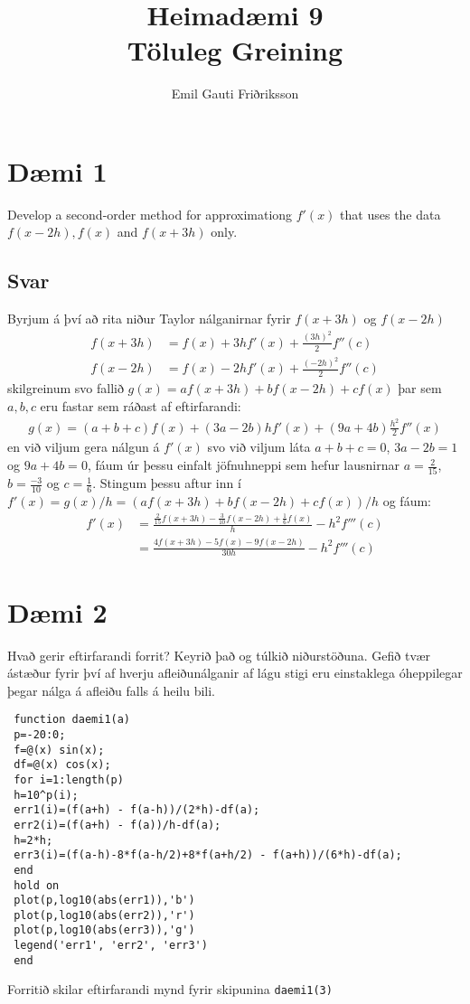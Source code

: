 \documentclass[11pt]{article}
\title{\vspace{-2ex}Heimadæmi 9\\ \vspace{0.2cm} \large Töluleg Greining\vspace{-2ex}}
\author{Emil Gauti Friðriksson}
\begin{document}
\maketitle
\section*{Dæmi 1}
Develop a second-order method for approximationg $f'(x)$ that uses the data $f(x-2h),f(x)$ and $f(x+3h)$ only.
\subsection*{Svar}
Byrjum á því að rita niður Taylor nálganirnar fyrir $f(x+3h)$ og $f(x-2h)$
\begin{align*}
f(x+3h) &= f(x) + 3hf'(x) + \frac{(3h)^2}{2}f''(c)\\
f(x-2h) &= f(x) - 2hf'(x) + \frac{(-2h)^2}{2}f''(c)
\end{align*}
skilgreinum svo fallið $g(x) = af(x+3h) + bf(x-2h) + cf(x)$ þar sem $a,b,c$ eru fastar sem ráðast af eftirfarandi:
\begin{align*}
g(x) = (a+b+c)f(x) + (3a-2b)hf'(x) + (9a+4b)\frac{h^2}{2}f''(x)
\end{align*}
en við viljum gera nálgun á $f'(x)$ svo við viljum láta $a+b+c = 0$, $3a-2b = 1$ og $9a+4b = 0$, fáum úr þessu einfalt jöfnuhneppi sem hefur lausnirnar $a=\frac{2}{15}$, $b=\frac{-3}{10} $ og $c=\frac 16$. Stingum þessu aftur inn í $f'(x) = g(x)/h = (af(x+3h) + bf(x-2h) + cf(x))/h$ og fáum:
\begin{align*}
f'(x) 	&= \frac{\frac{2}{15}f(x+3h)-\frac{3}{10}f(x-2h) + \frac{1}{6} f(x) }{h} - h^2f'''(c)\\
		&= \frac{4f(x+3h)-5f(x)-9f(x-2h)}{30h} - h^2f'''(c)
\end{align*}



\section*{Dæmi 2}
Hvað gerir eftirfarandi forrit? Keyrið það og túlkið niðurstöðuna. Gefið tvær ástæður fyrir því af hverju afleiðunálganir af lágu stigi eru einstaklega óheppilegar þegar nálga á afleiðu falls á heilu bili.

\begin{verbatim}
 function daemi1(a)
 p=-20:0;
 f=@(x) sin(x);
 df=@(x) cos(x);
 for i=1:length(p)
 h=10^p(i);
 err1(i)=(f(a+h) - f(a-h))/(2*h)-df(a);
 err2(i)=(f(a+h) - f(a))/h-df(a);
 h=2*h;
 err3(i)=(f(a-h)-8*f(a-h/2)+8*f(a+h/2) - f(a+h))/(6*h)-df(a);
 end
 hold on
 plot(p,log10(abs(err1)),'b')
 plot(p,log10(abs(err2)),'r')
 plot(p,log10(abs(err3)),'g')
 legend('err1', 'err2', 'err3')
 end
\end{verbatim}
Forritið skilar eftirfarandi mynd fyrir skipunina \texttt{daemi1(3)}
\end{document}

